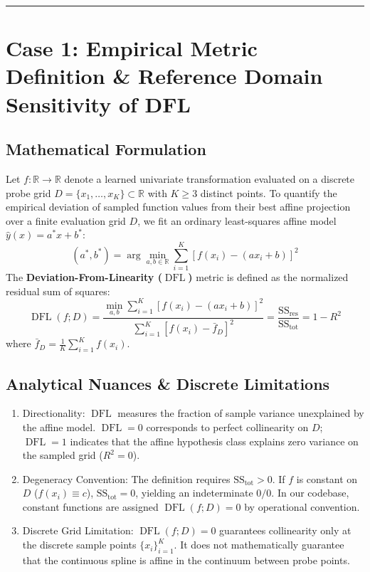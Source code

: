 \documentclass[11pt,a4paper]{article}
\begin{document}
\vspace{0.5em}
\hrule
\vspace{1em}

\section{Case 1: Empirical Metric Definition \& Reference Domain Sensitivity of DFL}

\subsection{Mathematical Formulation}
Let $f: \mathbb{R} \to \mathbb{R}$ denote a learned univariate transformation evaluated on a discrete probe grid $D = \{x_1, \dots, x_K\} \subset \mathbb{R}$ with $K \ge 3$ distinct points. To quantify the empirical deviation of sampled function values from their best affine projection over a finite evaluation grid $D$, we fit an ordinary least-squares affine model $\hat{y}(x) = a^* x + b^*$:
\begin{equation}
(a^*, b^*) = \arg\min_{a, b \in \mathbb{R}} \sum_{i=1}^K [f(x_i) - (a x_i + b)]^2
\end{equation}
The \textbf{Deviation-From-Linearity ($\operatorname{DFL}$)} metric is defined as the normalized residual sum of squares:
\begin{equation}
\boxed{
\operatorname{DFL}(f; D) = \frac{\min_{a, b} \sum_{i=1}^K [f(x_i) - (a x_i + b)]^2}{\sum_{i=1}^K [f(x_i) - \bar{f}_D]^2} = \frac{\mathrm{SS}_{\mathrm{res}}}{\mathrm{SS}_{\mathrm{tot}}} = 1 - R^2
}
\end{equation}
where $\bar{f}_D = \frac{1}{K} \sum_{i=1}^K f(x_i)$.

\subsection{Analytical Nuances \& Discrete Limitations}
\begin{enumerate}
    \item Directionality: $\operatorname{DFL}$ measures the fraction of sample variance unexplained by the affine model. $\operatorname{DFL} = 0$ corresponds to perfect collinearity on $D$; $\operatorname{DFL} = 1$ indicates that the affine hypothesis class explains zero variance on the sampled grid ($R^2 = 0$).
    \item Degeneracy Convention: The definition requires $\mathrm{SS}_{\mathrm{tot}} > 0$. If $f$ is constant on $D$ ($f(x_i) \equiv c$), $\mathrm{SS}_{\mathrm{tot}} = 0$, yielding an indeterminate $0/0$. In our codebase, constant functions are assigned $\operatorname{DFL}(f; D) = 0$ by operational convention.
    \item Discrete Grid Limitation: $\operatorname{DFL}(f; D) = 0$ guarantees collinearity only at the discrete sample points $\{x_i\}_{i=1}^K$. It does not mathematically guarantee that the continuous spline is affine in the continuum between probe points.
\end{enumerate}
\end{document}
